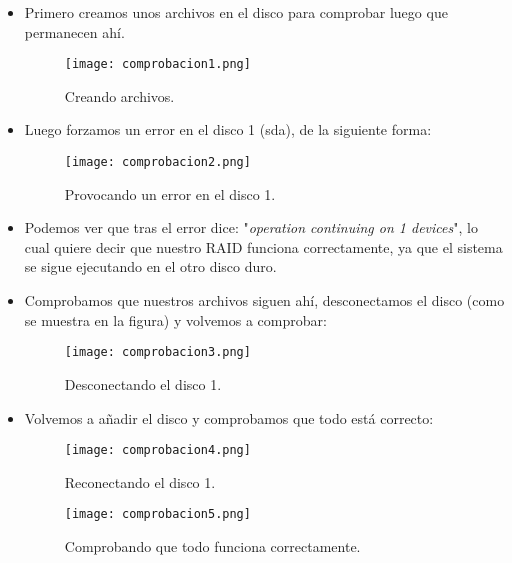 \documentclass[a4paper, 11pt]{article} %
\begin{document}
\begin{itemize}
\item Primero creamos unos archivos en el disco para comprobar luego que permanecen ahí.

\begin{figure}[h]
\centering 
\texttt{[image: comprobacion1.png]} 
\caption{Creando archivos.} 
\label{contexto:figura} 
\end{figure}

\pagebreak

\item Luego forzamos un error en el disco 1 (sda), de la siguiente forma:

\begin{figure}[h]
\centering 
\texttt{[image: comprobacion2.png]} 
\caption{Provocando un error en el disco 1.} 
\label{contexto:figura} 
\end{figure}

\item Podemos ver que tras el error dice: "\textit{operation continuing on 1 devices}", lo cual quiere decir que nuestro RAID funciona correctamente, ya que el sistema se sigue ejecutando en el otro disco duro.

\pagebreak

\item Comprobamos que nuestros archivos siguen ahí, desconectamos el disco (como se muestra en la figura) y volvemos a comprobar:

\begin{figure}[h]
\centering 
\texttt{[image: comprobacion3.png]} 
\caption{Desconectando el disco 1.} 
\label{contexto:figura} 
\end{figure}

\pagebreak

\item Volvemos a añadir el disco y comprobamos que todo está correcto:

\begin{figure}[h]
\centering 
\texttt{[image: comprobacion4.png]} 
\caption{Reconectando el disco 1.} 
\label{contexto:figura} 
\end{figure}

\pagebreak

\begin{figure}[h]
\centering 
\texttt{[image: comprobacion5.png]} 
\caption{Comprobando que todo funciona correctamente.} 
\label{contexto:figura} 
\end{figure}

\end{itemize}
\end{document}

